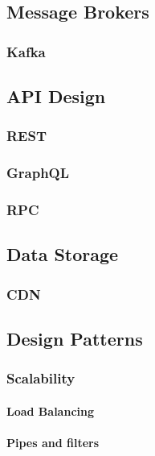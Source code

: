 \documentclass[a4paper, 11pt]{book}
\begin{document}
    \subsection{Message Brokers}

    \subsubsection{Kafka}

    \subsection{API Design}

    \subsubsection{REST}

    \subsubsection{GraphQL}

    \subsubsection{RPC}

    \subsection{Data Storage}

    \subsubsection{CDN}

    \subsection{Design Patterns}

    \subsubsection{Scalability}

    \paragraph{Load Balancing}

    \paragraph{Pipes and filters}
\end{document}
